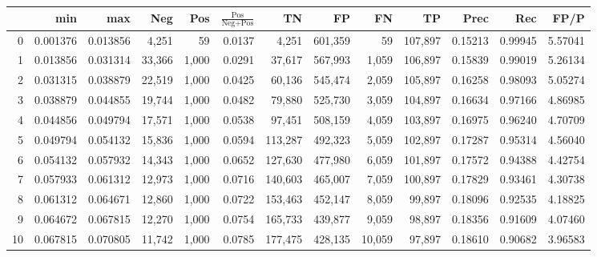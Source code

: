 \begin{tabular}{rrrrrrrrrrrrr}
\toprule
{} &       min &       max &     Neg &    Pos & $\frac{\text{Pos}}{\text{Neg}+\text{Pos}}$ &       TN &       FP &       FN &       TP &     Prec &      Rec &     FP/P \\
\midrule
0   &  0.001376 &  0.013856 &   4,251 &     59 &                                     0.0137 &    4,251 &  601,359 &       59 &  107,897 &  0.15213 &  0.99945 &  5.57041 \\
1   &  0.013856 &  0.031314 &  33,366 &  1,000 &                                     0.0291 &   37,617 &  567,993 &    1,059 &  106,897 &  0.15839 &  0.99019 &  5.26134 \\
2   &  0.031315 &  0.038879 &  22,519 &  1,000 &                                     0.0425 &   60,136 &  545,474 &    2,059 &  105,897 &  0.16258 &  0.98093 &  5.05274 \\
3   &  0.038879 &  0.044855 &  19,744 &  1,000 &                                     0.0482 &   79,880 &  525,730 &    3,059 &  104,897 &  0.16634 &  0.97166 &  4.86985 \\
4   &  0.044856 &  0.049794 &  17,571 &  1,000 &                                     0.0538 &   97,451 &  508,159 &    4,059 &  103,897 &  0.16975 &  0.96240 &  4.70709 \\
5   &  0.049794 &  0.054132 &  15,836 &  1,000 &                                     0.0594 &  113,287 &  492,323 &    5,059 &  102,897 &  0.17287 &  0.95314 &  4.56040 \\
6   &  0.054132 &  0.057932 &  14,343 &  1,000 &                                     0.0652 &  127,630 &  477,980 &    6,059 &  101,897 &  0.17572 &  0.94388 &  4.42754 \\
7   &  0.057933 &  0.061312 &  12,973 &  1,000 &                                     0.0716 &  140,603 &  465,007 &    7,059 &  100,897 &  0.17829 &  0.93461 &  4.30738 \\
8   &  0.061312 &  0.064671 &  12,860 &  1,000 &                                     0.0722 &  153,463 &  452,147 &    8,059 &   99,897 &  0.18096 &  0.92535 &  4.18825 \\
9   &  0.064672 &  0.067815 &  12,270 &  1,000 &                                     0.0754 &  165,733 &  439,877 &    9,059 &   98,897 &  0.18356 &  0.91609 &  4.07460 \\
10  &  0.067815 &  0.070805 &  11,742 &  1,000 &                                     0.0785 &  177,475 &  428,135 &   10,059 &   97,897 &  0.18610 &  0.90682 &  3.96583 \\

\end{tabular}
